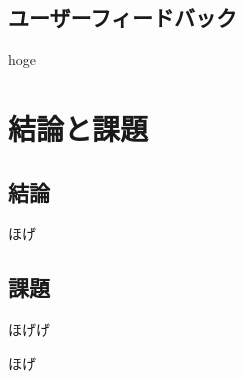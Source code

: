 \documentclass[syuuron]{kuee}
\begin{document}
	\section{ユーザーフィードバック}
	hoge

\chapter{結論と課題}
	\section{結論}
		ほげ
	\section{課題}
		ほげげ

\begin{acknowledgements}
	ほげ
\end{acknowledgements}
\end{document}
